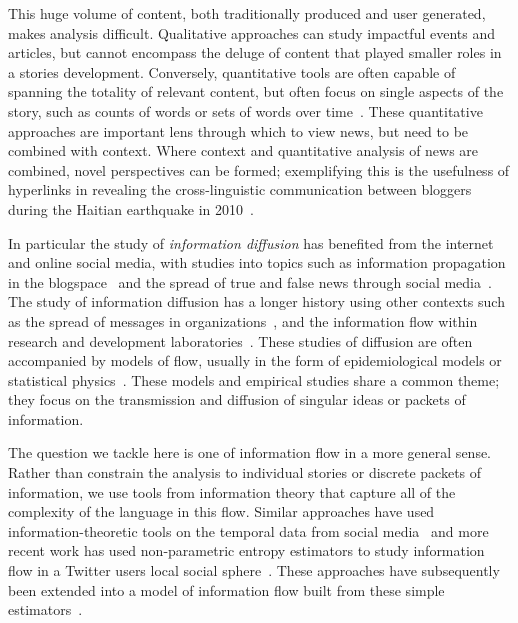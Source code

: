 This huge volume of content, both traditionally produced and user generated, makes analysis difficult. Qualitative approaches can study impactful events and articles, but cannot encompass the deluge of content that played smaller roles in a stories development. Conversely, quantitative tools are often capable of spanning the totality of relevant content, but often focus on single aspects of the story, such as counts of words or sets of words over time~\cite{michelQuantitative2011,patriciaChanging2013, pechenick2015characterizing}. These quantitative approaches are important lens through which to view news, but need to be combined with context. Where context and quantitative analysis of news are combined, novel perspectives can be formed; exemplifying this is the usefulness of hyperlinks in revealing the cross-linguistic communication between bloggers during the Haitian earthquake in 2010~\cite{haleNetIncreaseCrossLingual2012}. 


In particular the study of \emph{information diffusion} has benefited from the internet and online social media, with studies into topics such as information propagation in the blogspace~\cite{gruhlInformationDiffusionBlogspace2004} and the spread of true and false news through social media~\cite{vosoughiSpreadTrueFalse2018}. The study of information diffusion has a longer history using other contexts such as  the spread of messages in organizations~\cite{wuInformationFlowSocial2004}, and the information flow within research and development laboratories~\cite{allenInformationFlowResearch1969}. These studies of diffusion are often accompanied by models of flow, usually in the form of epidemiological models or statistical physics~\cite{castellanoStatisticalPhysicsSocial2009}. These models and empirical studies share a common theme; they focus on the transmission and diffusion of singular ideas or packets of information. 


The question we tackle here is one of information flow in a more general sense. Rather than constrain the analysis to individual stories or discrete packets of information, we use tools from information theory that capture all of the complexity of the language in this flow. Similar approaches have used information-theoretic tools on the temporal data from social media~\cite{versteegInformationTransferSocial2012} and more recent work has used non-parametric entropy estimators to study information flow in a Twitter users local social sphere~\cite{bagrowInformationFlowReveals2019}. These approaches have subsequently been extended into a model of information flow built from these simple estimators~\cite{bagrow_quoter_2018,pondComplexContagionFeatures2020}. 

